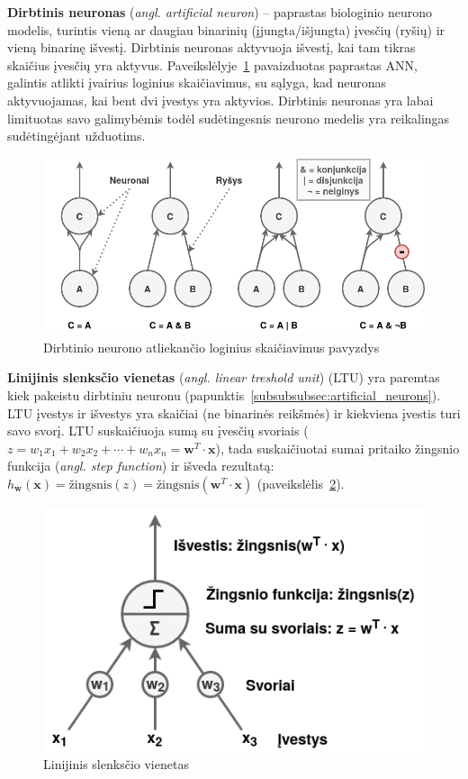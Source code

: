 \documentclass{VUMIFPSbakalaurinis}
\begin{document}
\label{subsubsubsec:artificial_neurons}
{
	\textbf{Dirbtinis neuronas} (\textit{angl. artificial neuron}) -- paprastas biologinio neurono modelis, turintis vieną ar daugiau binarinių (įjungta/išjungta) įvesčių (ryšių) ir vieną binarinę išvestį. Dirbtinis neuronas aktyvuoja išvestį, kai tam tikras skaičius įvesčių yra aktyvus. Paveikslėlyje~\ref{img:artificial_neurons} pavaizduotas paprastas ANN, galintis atlikti įvairius loginius skaičiavimus, su sąlyga, kad neuronas aktyvuojamas, kai bent dvi įvestys yra aktyvios. Dirbtinis neuronas yra labai limituotas savo galimybėmis todėl sudėtingesnis neurono medelis yra reikalingas sudėtingėjant užduotims. 
	
	\begin{figure}[H]
		\centering
		\includegraphics[scale=0.5]{img/artificial_neurons}
		\caption{Dirbtinio neurono atliekančio loginius skaičiavimus pavyzdys}
		\label{img:artificial_neurons}
	\end{figure} 
}
\label{subsubsubsec:ltu}
{
	\textbf{Linijinis slenksčio vienetas} (\textit{angl. linear treshold unit}) (LTU) yra paremtas kiek pakeistu dirbtiniu neuronu (papunktis~\ref{subsubsubsec:artificial_neurons}). LTU įvestys ir išvestys yra skaičiai (ne binarinės reikšmės) ir kiekviena įvestis turi savo svorį. LTU suskaičiuoja sumą su įvesčių svoriais (\(z = w_1 x_1 + w_2 x_2 + \cdots + w_n x_n = \mathbf{w}^T \cdot \mathbf{x} \)), tada suskaičiuotai sumai pritaiko žingsnio funkcija (\textit{angl. step function}) ir išveda rezultatą: \(h_\mathbf{w}(\mathbf{x}) = \textrm{žingsnis}(z) = \textrm{žingsnis}(\mathbf{w}^T \cdot \mathbf{x})\) (paveikslėlis~\ref{img:ltu}).
	
	\begin{figure}[H]
		\centering
		\includegraphics[scale=0.5]{img/ltu}
		\caption{Linijinis slenksčio vienetas}
		\label{img:ltu}
	\end{figure} 
}
\end{document}
